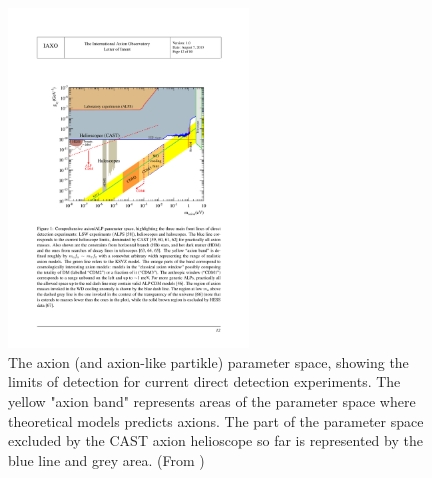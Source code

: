 \begin{figure}[htbp]
  \centering
    \includegraphics[height=9cm]{figures/cast/axion_search_cast2.pdf}
  \caption{\footnotesize The axion (and axion-like partikle) parameter space, showing the limits of detection for current direct detection experiments. The yellow "axion band" represents areas of the parameter space where theoretical models predicts axions. The part of the parameter space excluded by the CAST axion helioscope so far is represented by the blue line and grey area. (From \cite{Armengaud:2014eo})}
  \label{fig:axion_search_cast}
\end{figure}


